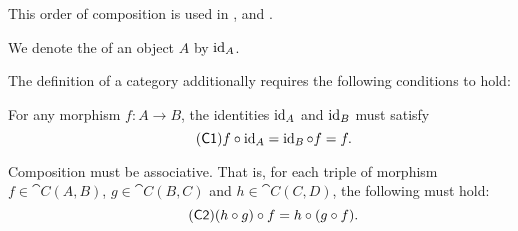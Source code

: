 \begin{definition}
\begin{thmenum}[series=def:category]
    This order of composition is used in \cite[7]{MacLane1994}, \cite[def. 1.1.1]{Leinster2016Basic} and \cite[def 3.1.]{Aluffi2009}.

     We denote the  of an object \( A \) by \( \operatorname{id}_A \).
  \end{thmenum}

  The definition of a category additionally requires the following conditions to hold:
  \begin{thmenum}[resume=def:category]
     For any morphism \( f: A \to B \), the identities \( \operatorname{id}_A \) and \( \operatorname{id}_B \) must satisfy
    \begin{equation}\label{eq:def:category/C1}\tag{\logic{C1}}
      f \bincirc \id_A = \id_B \bincirc f = f.
    \end{equation}

     Composition must be associative. That is, for each triple of morphism \( f \in \cat{C}(A, B) \), \( g \in \cat{C}(B, C) \) and \( h \in \cat{C}(C, D) \), the following must hold:
    \begin{equation}\label{eq:def:category/C2}\tag{\logic{C2}}
      (h \bincirc g) \bincirc f = h \bincirc (g \bincirc f).
    \end{equation}
  \end{thmenum}
\end{definition}

